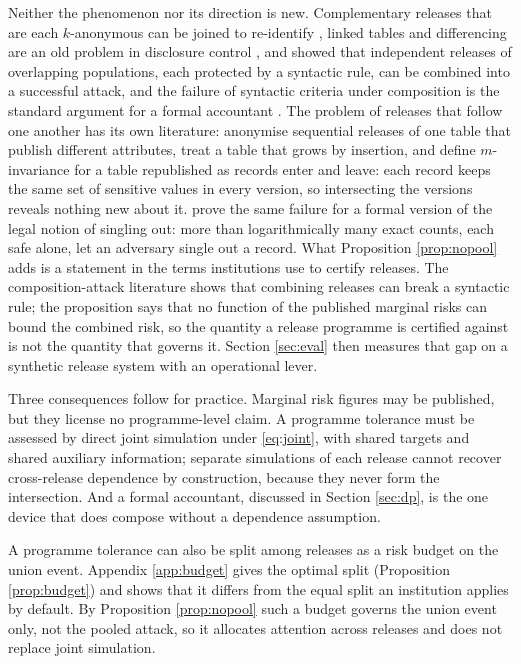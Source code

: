 \documentclass[11pt,a4paper]{article}
\theoremstyle{plain}
\theoremstyle{definition}
\theoremstyle{definition}
\theoremstyle{plain}
\begin{document}
Neither the phenomenon nor its direction is new. Complementary releases that are
each $k$-anonymous can be joined to re-identify \citep{sweeney2002}, linked
tables and differencing are an old problem in disclosure control
\citep[ch.~4]{hundepool2012}, and \citet{ganta2008} showed that
independent releases of overlapping populations, each protected by a syntactic
rule, can be combined into a successful attack, and the failure of syntactic
criteria under composition is the standard argument for a formal accountant
\citep{dwork2006a,dwork2014}. The problem of releases that follow one another
has its own literature: \citet{wang2006} anonymise sequential releases of one
table that publish different attributes, \citet{byun2006} treat a table that
grows by insertion, and \citet{xiao2007} define $m$-invariance for a table republished
as records enter and leave: each record keeps the same set of sensitive values
in every version, so intersecting the versions reveals nothing new about it. \citet{cohen2020} prove the same failure for a
formal version of the legal notion of singling out: more than logarithmically
many exact counts, each safe alone, let an adversary single out a record. What Proposition \ref{prop:nopool} adds is a
statement in the terms institutions use to certify releases. The
composition-attack literature shows that combining releases can break a syntactic rule;
the proposition says that no function of the published marginal risks can bound
the combined risk, so the quantity a release programme is certified against is
not the quantity that governs it. Section \ref{sec:eval} then measures that gap on
a synthetic release system with an operational lever.

Three consequences follow for practice. Marginal risk figures may be published,
but they license no programme-level claim. A programme tolerance must be
assessed by direct joint simulation under \eqref{eq:joint}, with shared targets
and shared auxiliary information; separate simulations of each release cannot
recover cross-release dependence by construction, because they never form the
intersection. And a formal accountant, discussed in Section \ref{sec:dp}, is
the one device that does compose without a dependence assumption.

A programme tolerance can also be split among releases as a risk budget on the
union event. Appendix \ref{app:budget} gives the optimal split (Proposition
\ref{prop:budget}) and shows that it differs from the equal split an institution
applies by default. By Proposition \ref{prop:nopool} such a budget governs the
union event only, not the pooled attack, so it allocates attention across
releases and does not replace joint simulation.
\end{document}
